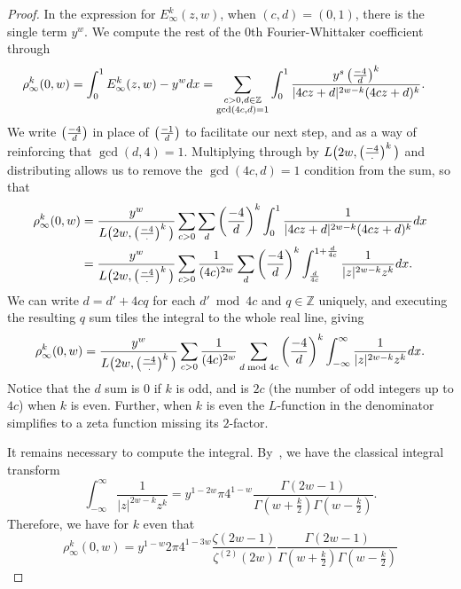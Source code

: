 \begin{proof}
  In the expression for $E_\infty^k(z,w)$, when $(c,d) = (0,1)$, there is the single term $y^w$.
  We compute the rest of the $0$th Fourier-Whittaker coefficient through
  \begin{align}
    \rho_\infty^k(0, w) &= \int_0^1 E_\infty^k(z,w) - y^w dx = \sum_{\substack{c > 0, d
    \in \mathbb{Z} \\ \gcd(4c,d) = 1}} \int_0^1 \frac{y^s \left(\frac{-4}{d}\right)^k}{\lvert 4cz + d
    \rvert^{2w - k} (4cz + d)^k}.
  \end{align}
  We write $\left(\frac{-4}{d}\right)$ in place of $\left(\frac{-1}{d}\right)$ to facilitate our next step, and as a
  way of reinforcing that $\gcd(d,4) = 1$.  Multiplying through by $L\big(2w,
  \left(\frac{-4}{\cdot}\right)^k\big)$ and distributing allows us to remove the $\gcd(4c, d) = 1$
  condition from the sum, so that
  \begin{align}
    \rho_\infty^k(0,w) &= \frac{y^w}{L\big(2w, \left(\frac{-4}{\cdot}\right)^k\big)} \sum_{c > 0}
    \sum_d \left(\frac{-4}{d}\right)^k \int_0^1  \frac{1}{\lvert 4cz+d \rvert^{2w-k}(4cz + d)^k} dx \\
    &= \frac{y^w}{L\big(2w, \left(\frac{-4}{\cdot}\right)^k\big)} \sum_{c > 0} \frac{1}{(4c)^{2w}} \sum_d
    \left(\frac{-4}{d}\right)^k \int_{\frac{d}{4c}}^{1 + \frac{d}{4c}}  \frac{1}{\lvert z
    \rvert^{2w-k}z^k} dx.
  \end{align}
  We can write $d = d' + 4cq$ for each $d' \bmod{4c}$ and $q \in \mathbb{Z}$ uniquely, and
  executing the resulting $q$ sum tiles the integral to the whole real line, giving
  \begin{equation}
    \rho_\infty^k(0,w) = \frac{y^w}{L\big(2w, \left(\frac{-4}{\cdot}\right)^k\big)} \sum_{c > 0}
    \frac{1}{(4c)^{2w}} \sum_{d \bmod 4c} \left(\frac{-4}{d}\right)^k \int_{-\infty}^{\infty}
    \frac{1}{\lvert z \rvert^{2w-k}z^k} dx.
  \end{equation}
  Notice that the $d$ sum is $0$ if $k$ is odd, and is $2c$ (the number of odd integers up
  to $4c$) when $k$ is even.  Further, when $k$ is even the $L$-function in the
  denominator simplifies to a zeta function missing its $2$-factor.

  It remains necessary to compute the integral.
  By~\cite[Section 13.7]{Iwaniec97}, we have the classical integral transform
  \begin{equation}\label{eq:IntegralIdentity_0th}
    \int_{-\infty}^\infty \frac{1}{\lvert z \rvert^{2w - k} z^k} = y^{1-2w} \pi 4^{1-w}
    \frac{\Gamma(2w-1)}{\Gamma(w + \frac{k}{2}) \Gamma(w - \frac{k}{2})}.
  \end{equation}
  Therefore, we have for $k$ even that
  \begin{equation}
    \rho_\infty^k(0,w) = y^{1-w} 2\pi 4^{1-3w} \frac{\zeta(2w-1)}{\zeta^{(2)}(2w)}
    \frac{\Gamma(2w-1)}{\Gamma(w + \frac{k}{2}) \Gamma(w - \frac{k}{2})}
  \end{equation}


\end{proof}
